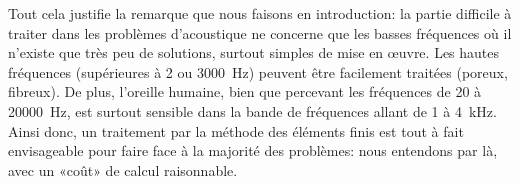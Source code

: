 \medskip
Tout cela justifie la remarque que nous faisons en introduction: la partie difficile à traiter dans les problèmes d'acoustique ne concerne que les basses fréquences où il n'existe que très peu de solutions, surtout simples de mise en œuvre. Les hautes fréquences (supérieures à 2 ou 3000~Hz) peuvent être facilement traitées (poreux, fibreux). De plus, l'oreille humaine, bien que percevant les fréquences de 20 à 20000~Hz, est surtout sensible dans la bande de fréquences allant de 1 à 4~kHz.  Ainsi donc, un traitement par la méthode des éléments finis est tout à fait envisageable pour faire face à la majorité des problèmes: nous entendons par là, avec un «coût» de calcul raisonnable.

